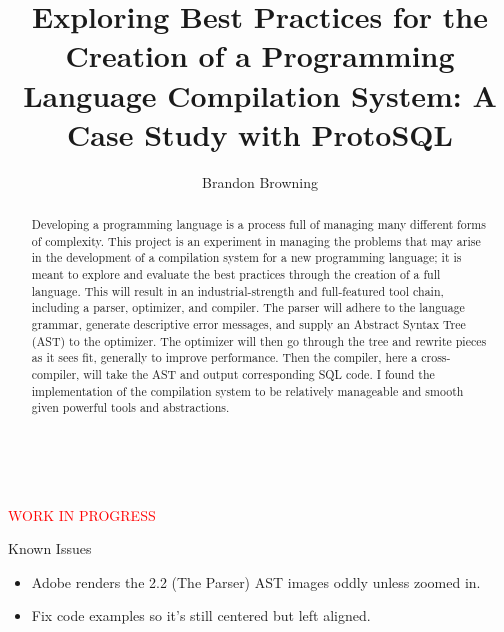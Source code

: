 \documentclass[titlepage]{article}
\begin{document}
	\thispagestyle{empty}
	\vspace*{\fill}
		~\centerline{\textcolor{red}{\Huge{WORK IN PROGRESS}}}
		\newline\newline

		\large{Known Issues}
		\begin{itemize}
			\item Adobe renders the 2.2 (The Parser) AST images oddly unless zoomed in.
			\item Fix code examples so it's still centered but left aligned.
		\end{itemize}

		\listoftodos
	\vspace*{\fill}

	\newpage

	\thispagestyle{empty}
	\title{Exploring Best Practices for the Creation of a Programming Language Compilation System: A Case Study with ProtoSQL}
	\author{Brandon Browning}
	\maketitle

	\begin{abstract}
		Developing a programming language is a process full of managing many different forms of complexity.  This project is an experiment in managing the problems that may arise in the development of a compilation system for a new programming language; it is meant to explore and evaluate the best practices through the creation of a full language.  This will result in an industrial-strength and full-featured tool chain, including a parser, optimizer, and compiler.  The parser will adhere to the language grammar, generate descriptive error messages, and supply an Abstract Syntax Tree (AST) to the optimizer.  The optimizer will then go through the tree and rewrite pieces as it sees fit, generally to improve performance.  Then the compiler, here a cross-compiler, will take the AST and output corresponding SQL code.  I found the implementation of the compilation system to be relatively manageable and smooth given powerful tools and abstractions.
	\end{abstract}

	\newpage

	\thispagestyle{empty}
	\tableofcontents
	\listoffigures

	\newpage

	\setcounter{page}{1}
\end{document}
